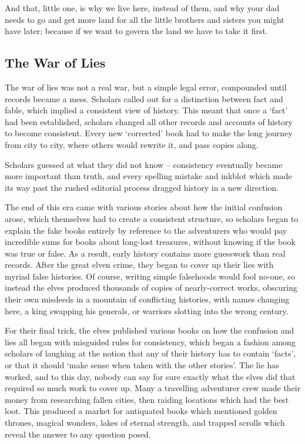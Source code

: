 \begin{multicols}{2}
\begin{exampletext}
  And that, little one, is why we live here, instead of them, and why your dad needs to go and get more land for all the little brothers and sisters you might have later; because if we want to govern the land we have to take it first.
\fi

\end{exampletext}

\subsection{The War of Lies}
\label{warOfLies}

\randomthree
\begin{exampletext}
  \ifcase\value{r3}\relax\or
    The war of lies was not a real war, but a simple legal error, compounded until records became a mess.
    Scholars called out for a distinction between fact and fable, which implied a consistent view of history.
    This meant that once a `fact' had been established, scholars changed all other records and accounts of history to become consistent.
    Every new `corrected' book had to make the long journey from city to city, where others would rewrite it, and pass copies along.

    Scholars guessed at what they did not know -- consistency eventually became more important than truth, and every spelling mistake and inkblot which made its way past the rushed editorial process dragged history in a new direction.

    The end of this era came with various stories about how the initial confusion arose, which themselves had to create a consistent structure, so scholars began to explain the fake books entirely by reference to the adventurers who would pay incredible sums for books about long-lost treasures, without knowing if the book was true or false.
    As a result, early history contains more guesswork than real records.
  \or
    After the great elven crime, they began to cover up their lies with myriad false histories.
    Of course, writing simple falsehoods would fool no-one, so instead the elves produced thousands of copies of nearly-correct works, obscuring their own misdeeds in a mountain of conflicting histories, with names changing here, a king swapping his generals, or warriors slotting into the wrong century.

    For their final trick, the elves published various books on how the confusion and lies all began with misguided rules for consistency, which began a fashion among scholars of laughing at the notion that any of their history has to contain `facts', or that it should `make sense when taken with the other stories'.
    The lie has worked, and to this day, nobody can say for sure exactly what the elves did that required so much work to cover up.
  \else
    Many a travelling adventurer crew made their money from researching fallen cities, then raiding locations which had the best loot.
    This produced a market for antiquated books which mentioned golden thrones, magical wonders, lakes of eternal strength, and trapped scrolls which reveal the answer to any question posed.


\end{exampletext}
\end{multicols}
